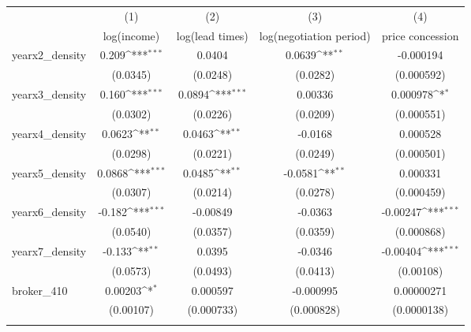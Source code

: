 {
\def\sym#1{\ifmmode^{#1}\else\(^{#1}\)\fi}
\begin{tabular}{l*{4}{c}}
\toprule
            &\multicolumn{1}{c}{(1)}&\multicolumn{1}{c}{(2)}&\multicolumn{1}{c}{(3)}&\multicolumn{1}{c}{(4)}\\
            &\multicolumn{1}{c}{log(income)}&\multicolumn{1}{c}{log(lead times)}&\multicolumn{1}{c}{log(negotiation period)}&\multicolumn{1}{c}{price concession}\\
\midrule
yearx2\_density&       0.209\sym{***}&      0.0404         &      0.0639\sym{**} &   -0.000194         \\
            &    (0.0345)         &    (0.0248)         &    (0.0282)         &  (0.000592)         \\
\addlinespace
yearx3\_density&       0.160\sym{***}&      0.0894\sym{***}&     0.00336         &    0.000978\sym{*}  \\
            &    (0.0302)         &    (0.0226)         &    (0.0209)         &  (0.000551)         \\
\addlinespace
yearx4\_density&      0.0623\sym{**} &      0.0463\sym{**} &     -0.0168         &    0.000528         \\
            &    (0.0298)         &    (0.0221)         &    (0.0249)         &  (0.000501)         \\
\addlinespace
yearx5\_density&      0.0868\sym{***}&      0.0485\sym{**} &     -0.0581\sym{**} &    0.000331         \\
            &    (0.0307)         &    (0.0214)         &    (0.0278)         &  (0.000459)         \\
\addlinespace
yearx6\_density&      -0.182\sym{***}&    -0.00849         &     -0.0363         &    -0.00247\sym{***}\\
            &    (0.0540)         &    (0.0357)         &    (0.0359)         &  (0.000868)         \\
\addlinespace
yearx7\_density&      -0.133\sym{**} &      0.0395         &     -0.0346         &    -0.00404\sym{***}\\
            &    (0.0573)         &    (0.0493)         &    (0.0413)         &   (0.00108)         \\
\addlinespace
broker\_410  &     0.00203\sym{*}  &    0.000597         &   -0.000995         &  0.00000271         \\
            &   (0.00107)         &  (0.000733)         &  (0.000828)         & (0.0000138)         \\
\addlinespace

\end{tabular}}
